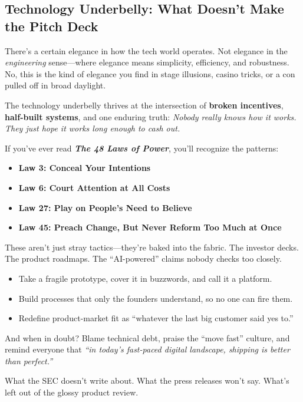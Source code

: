   \subsection{Technology Underbelly: What Doesn’t Make the Pitch Deck}

  There’s a certain elegance in how the tech world operates.  
  Not elegance in the \textit{engineering} sense—where elegance means simplicity, efficiency, and robustness.  
  No, this is the kind of elegance you find in stage illusions, casino tricks, or a con pulled off in broad daylight.
  
  The technology underbelly thrives at the intersection of \textbf{broken incentives}, \textbf{half-built systems}, and one enduring truth:  
  \textit{Nobody really knows how it works. They just hope it works long enough to cash out.}
  
  If you’ve ever read \textbf{\textit{The 48 Laws of Power}}, you’ll recognize the patterns:
  
  \begin{itemize}
    \item \textbf{Law 3: Conceal Your Intentions}
    \item \textbf{Law 6: Court Attention at All Costs}
    \item \textbf{Law 27: Play on People’s Need to Believe}
    \item \textbf{Law 45: Preach Change, But Never Reform Too Much at Once}
  \end{itemize}
  
  These aren’t just stray tactics—they’re baked into the fabric.  
  The investor decks. The product roadmaps. The “AI-powered” claims nobody checks too closely.
  
  \begin{itemize}
    \item Take a fragile prototype, cover it in buzzwords, and call it a platform.
    \item Build processes that only the founders understand, so no one can fire them.
    \item Redefine product-market fit as “whatever the last big customer said yes to.”
  \end{itemize}
  
  And when in doubt? Blame technical debt, praise the “move fast” culture, and remind everyone that  
  \textit{“in today’s fast-paced digital landscape, shipping is better than perfect.”}
  
  What the SEC doesn’t write about.  
  What the press releases won’t say.  
  What’s left out of the glossy product review.
  
